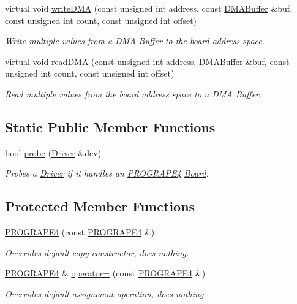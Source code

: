 \begin{CompactItemize}
virtual void \hyperlink{classmprace_1_1PROGRAPE4_a6}{write\-DMA} (const unsigned int address, const \hyperlink{classmprace_1_1DMABuffer}{DMABuffer} \&buf, const unsigned int count, const unsigned int offset)
\begin{CompactList}\small\item\em Write multiple values from a DMA Buffer to the board address space. \item\end{CompactList}\item 
virtual void \hyperlink{classmprace_1_1PROGRAPE4_a7}{read\-DMA} (const unsigned int address, \hyperlink{classmprace_1_1DMABuffer}{DMABuffer} \&buf, const unsigned int count, const unsigned int offset)
\begin{CompactList}\small\item\em Read multiple values from the board address space to a DMA Buffer. \item\end{CompactList}\end{CompactItemize}
\subsection*{Static Public Member Functions}
\begin{CompactItemize}
\item 
bool \hyperlink{classmprace_1_1PROGRAPE4_e0}{probe} (\hyperlink{classmprace_1_1Driver}{Driver} \&dev)
\begin{CompactList}\small\item\em Probes a \hyperlink{classmprace_1_1Driver}{Driver} if it handles an \hyperlink{classmprace_1_1PROGRAPE4}{PROGRAPE4} \hyperlink{classmprace_1_1Board}{Board}. \item\end{CompactList}\end{CompactItemize}
\subsection*{Protected Member Functions}
\begin{CompactItemize}
\item 
\hyperlink{classmprace_1_1PROGRAPE4_b0}{PROGRAPE4} (const \hyperlink{classmprace_1_1PROGRAPE4}{PROGRAPE4} \&)
\begin{CompactList}\small\item\em Overrides default copy constructor, does nothing. \item\end{CompactList}\item 
\hyperlink{classmprace_1_1PROGRAPE4}{PROGRAPE4} \& \hyperlink{classmprace_1_1PROGRAPE4_b1}{operator=} (const \hyperlink{classmprace_1_1PROGRAPE4}{PROGRAPE4} \&)
\begin{CompactList}\small\item\em Overrides default assignment operation, does nothing. \item\end{CompactList}\end{CompactItemize}

